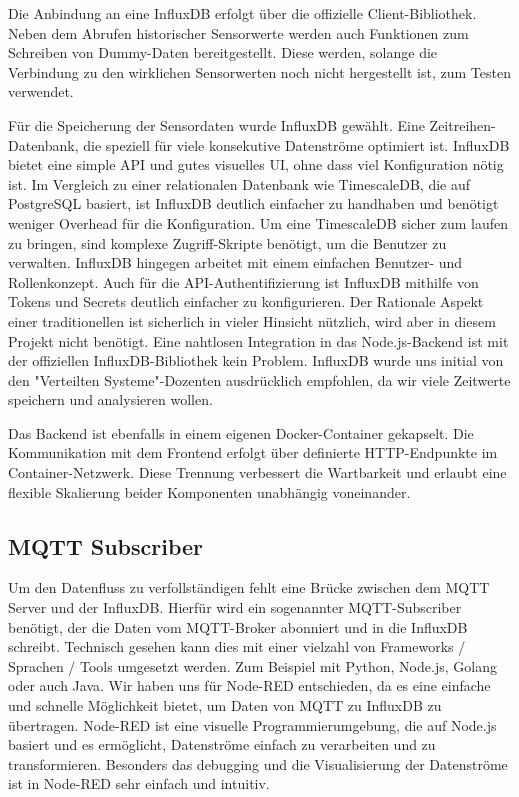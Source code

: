 Die Anbindung an eine InfluxDB erfolgt über die offizielle Client-Bibliothek. 
Neben dem Abrufen historischer Sensorwerte werden auch Funktionen zum Schreiben von Dummy-Daten bereitgestellt.
Diese werden, solange die Verbindung zu den wirklichen Sensorwerten noch nicht hergestellt ist, zum Testen verwendet.

Für die Speicherung der Sensordaten wurde InfluxDB gewählt. 
Eine Zeitreihen-Datenbank, die speziell für viele konsekutive Datenströme optimiert ist. 
InfluxDB bietet eine simple API und gutes visuelles UI, ohne dass viel Konfiguration nötig ist.
Im Vergleich zu einer relationalen Datenbank wie TimescaleDB, die auf PostgreSQL basiert,
ist InfluxDB deutlich einfacher zu handhaben und benötigt weniger Overhead für die Konfiguration.
Um eine TimescaleDB sicher zum laufen zu bringen, sind komplexe Zugriff-Skripte benötigt, um die Benutzer zu verwalten.
InfluxDB hingegen arbeitet mit einem einfachen Benutzer- und Rollenkonzept. 
Auch für die API-Authentifizierung ist InfluxDB mithilfe von Tokens und Secrets deutlich einfacher zu konfigurieren.
Der Rationale Aspekt einer traditionellen ist sicherlich in vieler Hinsicht nützlich, wird aber in diesem Projekt nicht benötigt.
Eine nahtlosen Integration in das Node.js-Backend ist mit der offiziellen InfluxDB-Bibliothek kein Problem.
InfluxDB wurde uns initial von den "Verteilten Systeme"-Dozenten ausdrücklich empfohlen, da wir viele Zeitwerte speichern und analysieren wollen.

Das Backend ist ebenfalls in einem eigenen Docker-Container gekapselt. 
Die Kommunikation mit dem Frontend erfolgt über definierte HTTP-Endpunkte im Container-Netzwerk. 
Diese Trennung verbessert die Wartbarkeit und erlaubt eine flexible Skalierung beider Komponenten unabhängig voneinander.

\subsection{MQTT Subscriber}
Um den Datenfluss zu verfollständigen fehlt eine Brücke zwischen dem MQTT Server und der InfluxDB. 
Hierfür wird ein sogenannter MQTT-Subscriber benötigt, der die Daten vom MQTT-Broker abonniert und in die InfluxDB schreibt.
Technisch gesehen kann dies mit einer vielzahl von Frameworks / Sprachen / Tools umgesetzt werden. 
Zum Beispiel mit Python, Node.js, Golang oder auch Java.
Wir haben uns für Node-RED entschieden, da es eine einfache und schnelle Möglichkeit bietet, um Daten von MQTT zu InfluxDB zu übertragen.
Node-RED ist eine visuelle Programmierumgebung, die auf Node.js basiert und es ermöglicht, Datenströme einfach zu verarbeiten und zu transformieren.
Besonders das debugging und die Visualisierung der Datenströme ist in Node-RED sehr einfach und intuitiv.
\cite{nodered2023docs}


